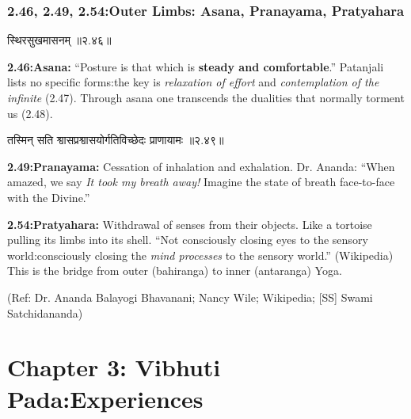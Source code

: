 \begin{frame}[fragile]\frametitle{2.46, 2.49, 2.54:Outer Limbs: Asana, Pranayama, Pratyahara}

\begin{sanskrit}
स्थिरसुखमासनम् ॥२.४६॥
\end{sanskrit}

\textbf{2.46:Asana:} ``Posture is that which is \textbf{steady and comfortable}.'' Patanjali lists no specific forms:the key is \emph{relaxation of effort} and \emph{contemplation of the infinite} (2.47). Through asana one transcends the dualities that normally torment us (2.48).

\begin{sanskrit}
तस्मिन् सति श्वासप्रश्वासयोर्गतिविच्छेदः प्राणायामः ॥२.४९॥
\end{sanskrit}

\textbf{2.49:Pranayama:} Cessation of inhalation and exhalation. Dr. Ananda: ``When amazed, we say \emph{It took my breath away!} Imagine the state of breath face-to-face with the Divine.''

\textbf{2.54:Pratyahara:} Withdrawal of senses from their objects. Like a tortoise pulling its limbs into its shell. ``Not consciously closing eyes to the sensory world:consciously closing the \emph{mind processes} to the sensory world.'' (Wikipedia) This is the bridge from outer (bahiranga) to inner (antaranga) Yoga.

\tiny{(Ref: Dr. Ananda Balayogi Bhavanani; Nancy Wile; Wikipedia; [SS] Swami Satchidananda)}

\end{frame}

\section[Vibhutipad]{Chapter 3: Vibhuti Pada:Experiences}

